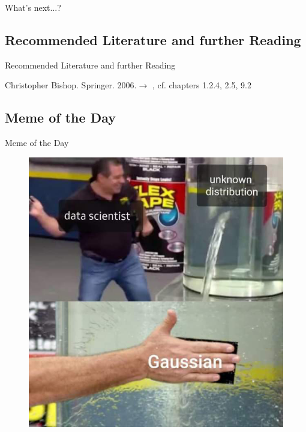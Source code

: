 \begin{frame}{What's next...?}{}
\end{frame}


\subsection{Recommended Literature and further Reading}

\begin{frame}[allowframebreaks]{Recommended Literature and further Reading}{}
	\footnotesize
	\begin{thebibliography}{2}
			{Christopher Bishop. Springer. 2006.}{$\rightarrow$ \href{
				http://users.isr.ist.utl.pt/~wurmd/Livros/school/Bishop\%20-\%20Pattern\%20Recognition\%20And\%20Machine\%20Learning\%20-\%20Springer\%20\%202006.pdf
			}{}, cf. chapters 1.2.4, 2.5, 9.2}
	\end{thebibliography}
\end{frame}


\subsection{Meme of the Day}

\begin{frame}{Meme of the Day}{}
	\begin{figure}
		\includegraphics[scale=0.90]{04_density_estimation/02_img/gaussianseverywhere}
	\end{figure}
\end{frame}


\makethanks

